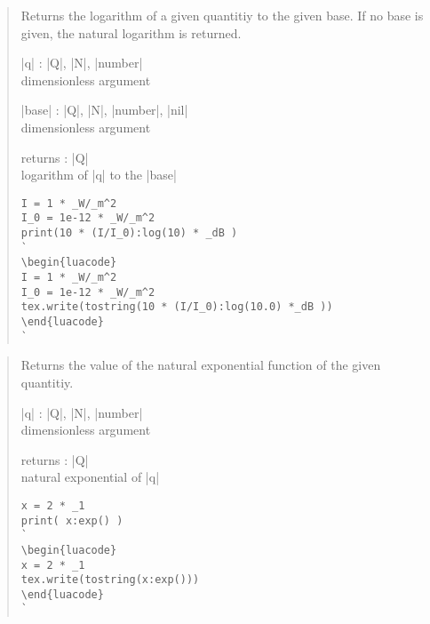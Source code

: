 \documentclass{ltxdoc}
\begin{document}
\begin{quote}
  Returns the logarithm of a given quantitiy to the given base. If no base is given, the natural logarithm is returned.

  \begin{description}
  \item |q| : |Q|, |N|, |number|\\
    dimensionless argument

  \item |base| : |Q|, |N|, |number|, |nil|\\
    dimensionless argument

  \item returns : |Q|\\
    logarithm  of |q| to the |base|
  \end{description}


\begin{lstlisting}
I = 1 * _W/_m^2
I_0 = 1e-12 * _W/_m^2
print(10 * (I/I_0):log(10) * _dB )
`
\begin{luacode}
I = 1 * _W/_m^2
I_0 = 1e-12 * _W/_m^2
tex.write(tostring(10 * (I/I_0):log(10.0) *_dB ))
\end{luacode}
`
\end{lstlisting}
\end{quote}




\begin{quote}
  Returns the value of the natural exponential function of the given quantitiy.

  \begin{description}
  \item |q| : |Q|, |N|, |number|\\
    dimensionless argument

  \item returns : |Q|\\
    natural exponential of |q|
  \end{description}

\begin{lstlisting}
x = 2 * _1
print( x:exp() )
`
\begin{luacode}
x = 2 * _1
tex.write(tostring(x:exp()))
\end{luacode}
`
\end{lstlisting}

\end{quote}
\end{document}

